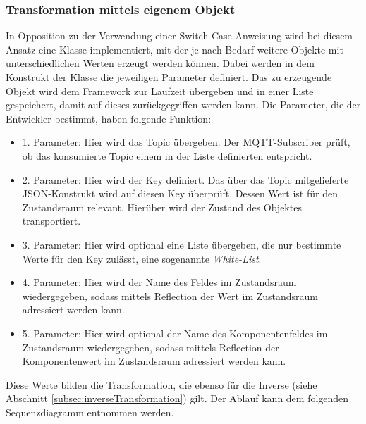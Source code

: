     \subsubsection*{Transformation mittels eigenem Objekt}
        In Opposition zu der Verwendung einer Switch-Case-Anweisung wird bei diesem Ansatz eine Klasse implementiert, mit der je nach Bedarf 
        weitere Objekte mit unterschiedlichen Werten erzeugt werden können. Dabei werden in dem Konstrukt der Klasse die jeweiligen Parameter 
        definiert. Das zu erzeugende Objekt wird dem Framework zur Laufzeit übergeben und in einer Liste gespeichert, damit auf dieses zurückgegriffen werden kann. 
        Die Parameter, die der Entwickler bestimmt, haben folgende Funktion:
        \begin{itemize}
            \item 1. Parameter: Hier wird das Topic übergeben. Der \acs{MQTT}-Subscriber prüft, ob das konsumierte Topic einem in der Liste definierten entspricht.
            \item 2. Parameter: Hier wird der Key definiert. Das über das Topic mitgelieferte JSON-Konstrukt wird auf diesen Key überprüft. Dessen Wert ist für den Zustandsraum relevant. Hierüber wird der Zustand des Objektes transportiert.
            \item 3. Parameter: Hier wird optional eine Liste übergeben, die nur bestimmte Werte für den Key zulässt, eine sogenannte \textit{White-List}.
            \item 4. Parameter: Hier wird der Name des Feldes im Zustandsraum wiedergegeben, sodass mittels Reflection der Wert im Zustandsraum adressiert werden kann.
            \item 5. Parameter: Hier wird optional der Name des Komponentenfeldes im Zustandsraum wiedergegeben, sodass mittels Reflection der Komponentenwert im Zustandsraum adressiert werden kann.
        \end{itemize}
        Diese Werte bilden die Transformation, die ebenso für die Inverse (siehe Abschnitt \ref{subsec:inverseTransformation}) gilt.
        Der Ablauf kann dem folgenden Sequenzdiagramm entnommen werden. 
        \\
        \pagebreak
